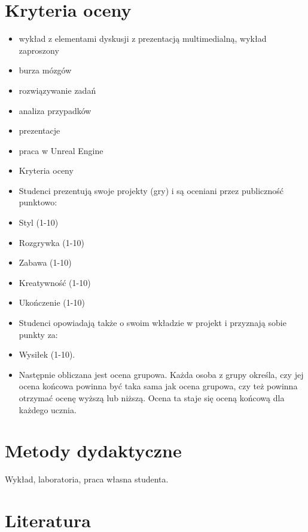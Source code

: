 \documentclass[12pt, a4paper]{article}
\begin{document}
\section{Kryteria oceny}

\begin{itemize}
  \item wykład z elementami dyskusji z prezentacją multimedialną, wykład zaproszony
  \item burza mózgów
  \item rozwiązywanie zadań
  \item analiza przypadków
  \item prezentacje
  \item praca w Unreal Engine
  \item Kryteria oceny
  \item Studenci prezentują swoje projekty (gry) i są oceniani przez publiczność punktowo:
  \item Styl (1-10)
  \item Rozgrywka (1-10)
  \item Zabawa (1-10)
  \item Kreatywność (1-10)
  \item Ukończenie (1-10)
  \item Studenci opowiadają także o swoim wkładzie w projekt i przyznają sobie punkty za:
  \item Wysiłek (1-10).
  \item Następnie obliczana jest ocena grupowa. Każda osoba z grupy określa, czy jej ocena końcowa powinna być taka sama jak ocena grupowa, czy też powinna otrzymać ocenę wyższą lub niższą. Ocena ta staje się oceną końcową dla każdego ucznia.
\end{itemize}

\section{Metody dydaktyczne}

Wykład, laboratoria, praca własna studenta.

\section{Literatura}
\end{document}
